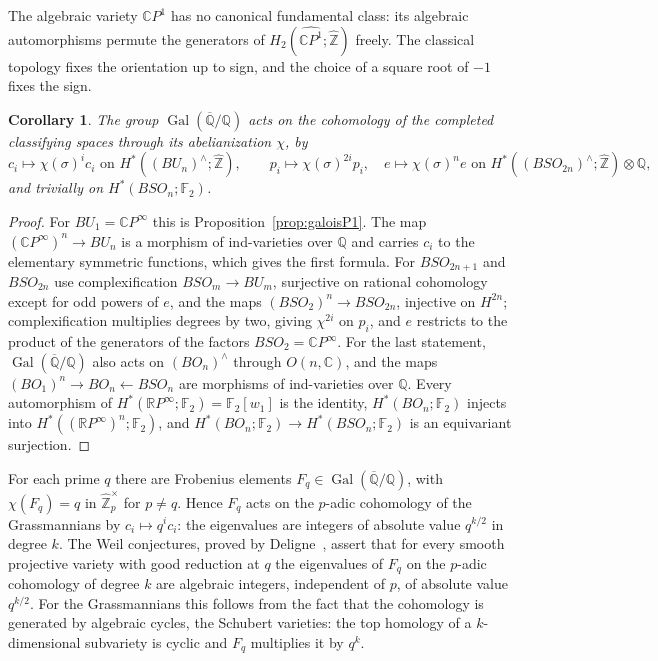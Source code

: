 \documentclass[11pt]{amsart}
\theoremstyle{plain}
\newtheorem{corollary}[theorem]{Corollary}
\theoremstyle{definition}
\numberwithin{equation}{section}
\newcommand{\Q}{\mathbb{Q}}
\newcommand{\C}{\mathbb{C}}
\newcommand{\F}{\mathbb{F}}
\newcommand{\Zhat}{\widehat{\mathbb{Z}}}
\newcommand{\Qbar}{\overline{\mathbb{Q}}}
\newcommand{\CP}{\mathbb{C}P}
\newcommand{\RP}{\mathbb{R}P}
\newcommand{\units}{^{\times}}
\DeclareMathOperator{\Gal}{Gal}
\begin{document}
The algebraic variety $\CP^1$ has no canonical fundamental class: its algebraic automorphisms permute the generators of $H_2(\widehat{\CP^1};\Zhat)$ freely.
The classical topology fixes the orientation up to sign, and the choice of a square root of $-1$ fixes the sign.

\begin{corollary}\label{cor:galoischern}
The group $\Gal(\Qbar/\Q)$ acts on the cohomology of the completed classifying spaces through its abelianization $\chi$, by
\[
c_i\mapsto\chi(\sigma)^ic_i\text{ on }H^*((BU_n)^\wedge;\Zhat),\qquad p_i\mapsto\chi(\sigma)^{2i}p_i,\quad e\mapsto\chi(\sigma)^ne\text{ on }H^*((BSO_{2n})^\wedge;\Zhat)\otimes\Q,
\]
and trivially on $H^*(BSO_n;\F_2)$.
\end{corollary}

\begin{proof}
For $BU_1=\CP^\infty$ this is Proposition~\ref{prop:galoisP1}.
The map $(\CP^\infty)^n\to BU_n$ is a morphism of ind-varieties over $\Q$ and carries $c_i$ to the elementary symmetric functions, which gives the first formula.
For $BSO_{2n+1}$ and $BSO_{2n}$ use complexification $BSO_m\to BU_m$, surjective on rational cohomology except for odd powers of $e$, and the maps $(BSO_2)^n\to BSO_{2n}$, injective on $H^{2n}$; complexification multiplies degrees by two, giving $\chi^{2i}$ on $p_i$, and $e$ restricts to the product of the generators of the factors $BSO_2=\CP^\infty$.
For the last statement, $\Gal(\Qbar/\Q)$ also acts on $(BO_n)^\wedge$ through $O(n,\C)$, and the maps $(BO_1)^n\to BO_n\leftarrow BSO_n$ are morphisms of ind-varieties over $\Q$.
Every automorphism of $H^*(\RP^\infty;\F_2)=\F_2[w_1]$ is the identity, $H^*(BO_n;\F_2)$ injects into $H^*((\RP^\infty)^n;\F_2)$, and $H^*(BO_n;\F_2)\to H^*(BSO_n;\F_2)$ is an equivariant surjection.
\end{proof}

For each prime $q$ there are Frobenius elements $F_q\in\Gal(\Qbar/\Q)$, with $\chi(F_q)=q$ in $\Zhat_p\units$ for $p\ne q$.
Hence $F_q$ acts on the $p$-adic cohomology of the Grassmannians by $c_i\mapsto q^ic_i$: the eigenvalues are integers of absolute value $q^{k/2}$ in degree $k$.
The Weil conjectures, proved by Deligne~\cite{DeligneWeil}, assert that for every smooth projective variety with good reduction at $q$ the eigenvalues of $F_q$ on the $p$-adic cohomology of degree $k$ are algebraic integers, independent of $p$, of absolute value $q^{k/2}$.
For the Grassmannians this follows from the fact that the cohomology is generated by algebraic cycles, the Schubert varieties: the top homology of a $k$-dimensional subvariety is cyclic and $F_q$ multiplies it by $q^k$.
\end{document}
